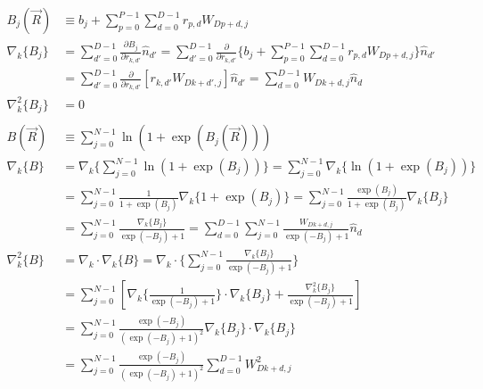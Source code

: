 \documentclass[12pt]{article}
\begin{document}
\begin{align*}
B_j(\vec{R}) &\equiv b_j + \sum_{p=0}^{P-1}\sum_{d=0}^{D-1} r_{p,d} W_{Dp+d,j}\\
\nabla_k \{ B_j \}  &= \sum_{d'=0}^{D-1} \frac{\partial B_j}{\partial r_{k,d'}} \hat{n}_{d'} = \sum_{d'=0}^{D-1} \frac{\partial}{\partial r_{k,d'}} \bigg\{ b_j + \sum_{p=0}^{P-1}\sum_{d=0}^{D-1} r_{p,d} W_{Dp+d,j} \bigg\} \hat{n}_{d'}\\
&= \sum_{d'=0}^{D-1} \frac{\partial}{\partial r_{k,d'}} \left[ r_{k,d'} W_{Dk+d',j} \right] \hat{n}_{d'} = \sum_{d=0}^{D-1} W_{Dk+d,j} \hat{n}_d \\
\nabla_k^2 \{ B_j \} &= 0\\ \\
B(\vec{R}) &\equiv \sum_{j=0}^{N-1} \ln \left(  1 + \exp \left( B_j (\vec{R}) \right) \right)\\
\nabla_k \{ B \} &= \nabla_k \bigg\{ \sum_{j=0}^{N-1} \ln \left(  1 + \exp \left( B_j \right) \right) \bigg\}= \sum_{j=0}^{N-1}\nabla_k \bigg\{  \ln \left(  1 + \exp \left( B_j \right) \right) \bigg\} \\
&=\sum_{j=0}^{N-1} \frac{1}{1+\exp(B_j)} \nabla_k \Big\{ 1+\exp(B_j) \Big\} 
=\sum_{j=0}^{N-1} \frac{\exp(B_j)}{1+\exp(B_j)} \nabla_k \{ B_j \}\\
&=\sum_{j=0}^{N-1} \frac{\nabla_k \{ B_j \}}{\exp(-B_j)+1}  = \sum_{d=0}^{D-1} \sum_{j=0}^{N-1}  \frac{W_{Dk+d,j}}{\exp(-B_j)+1}   \hat{n}_d \\
\nabla_k^2 \{ B\} &= \nabla_k \cdot \nabla_k \{ B \} = \nabla_k \cdot \bigg\{  \sum_{j=0}^{N-1} \frac{\nabla_k \{ B_j \}}{\exp(-B_j)+1}  \bigg\}\\
&= \sum_{j=0}^{N-1} \left[ \nabla_k \Big\{ \frac{1}{\exp(-B_j)+1} \Big\} \cdot \nabla_k \{ B_j \} + \frac{\nabla_k^2 \{ B_j \}}{\exp(-B_j)+1} \right]\\
&= \sum_{j=0}^{N-1} \frac{\exp(-B_j)}{(\exp(-B_j)+1)^2} \nabla_k \{ B_j \} \cdot \nabla_k \{ B_j \}\\
&= \sum_{j=0}^{N-1} \frac{\exp(-B_j)}{(\exp(-B_j)+1)^2} \sum_{d=0}^{D-1} W_{Dk+d,j}^2
\end{align*}
\end{document}
